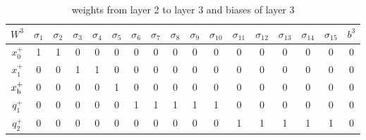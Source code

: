 \begin{table}[p]
	\centering
	\begin{tabular}{|c| c c c c c c c c c c c c c c c |c|}
		\hline 
		$W^3$ & $\sigma_1$ & $\sigma_2$ & $\sigma_3$ & $\sigma_4$ & $\sigma_5$ & $\sigma_6$ & $\sigma_7$ & $\sigma_8$ & $\sigma_9$ &  $\sigma_{10}$ & $\sigma_{11}$ & $\sigma_{12}$ & $\sigma_{13}$ & $\sigma_{14}$ & $\sigma_{15}$ & $b^3$ \\
		\hline
		$x_0^+$ & 1 & 1 & 0 & 0 & 0 & 0 & 0 & 0 & 0 & 0 & 0 & 0 & 0 & 0 & 0 & 0 \\
		$x_1^+$ & 0 & 0 & 1 & 1 & 0 & 0 & 0 & 0 & 0 & 0 & 0 & 0 & 0 & 0 & 0 & 0 \\
		$x_{\mathrm{h}}^+$ & 0 & 0 & 0 & 0 & 1 & 0 & 0 & 0 & 0 & 0 & 0 & 0 & 0 & 0 & 0 & 0 \\
		$q_1^+$ & 0 & 0 & 0 & 0 & 0 & 1 & 1 & 1 & 1 & 1 & 0 & 0 & 0 & 0 & 0 & 0 \\
		$q_2^+$ & 0 & 0 & 0 & 0 & 0 & 0 & 0 & 0 & 0 & 0 & 1 & 1 & 1 & 1 & 1 & 0 \\
		\hline
	\end{tabular}
	\caption{weights from layer 2 to layer 3 and biases of layer 3}
	\label{tab:W3b3ex}
\end{table}